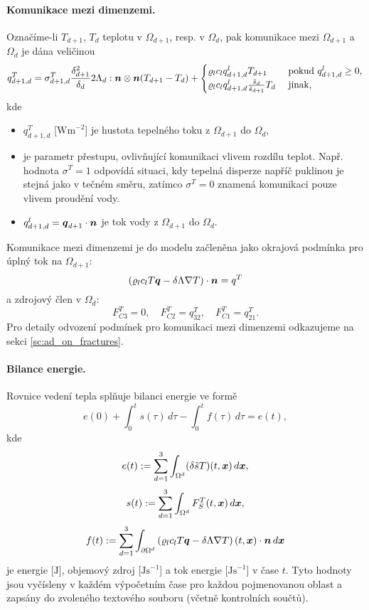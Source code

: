 \paragraph{Komunikace mezi dimenzemi.}
Označíme-li $T_{d+1}$, $T_d$ teplotu v $\Omega_{d+1}$, resp. v $\Omega_d$, pak komunikace mezi $\Omega_{d+1}$ a $\Omega_d$ je dána veličinou
\begin{equation}
  \label{e:inter_dim_flux_heat}
  q^T_{d+1,d} = \sigma^T_{d+1,d} \frac{\delta_{d+1}^2}{\delta_d}2\Lambda_d:\mathbf{\boldsymbol{n}}\otimes\mathbf{\boldsymbol{n}} ( T_{d+1} - T_d)
  + \begin{cases} \varrho_l c_l q^l_{d+1,d} T_{d+1} & \mbox{ pokud }q^l_{d+1,d}\ge 0,\\\varrho_l c_l q^l_{d+1,d} \frac{\tilde s_d}{\tilde s_{d+1}} T_d & \mbox{ jinak},\end{cases}
\end{equation}
kde
\begin{itemize}
\item $q^T_{d+1,d}$ [$\mathrm{Wm}^{-2}$] je hustota tepelného toku z $\Omega_{d+1}$ do $\Omega_d$,
\item {} \units{}{}{} je parametr přestupu, ovlivňující komunikaci vlivem rozdílu teplot.
Např. hodnota $\sigma^T=1$ odpovídá situaci, kdy tepelná disperze napříč puklinou je stejná jako v tečném směru, zatímco $\sigma^T=0$ znamená komunikaci pouze vlivem proudění vody.
\item $q^l_{d+1,d}=\mathbf{\boldsymbol{q}}_{d+1}\cdot\mathbf{\boldsymbol{n}}$ je tok vody z $\Omega_{d+1}$ do $\Omega_d$.
\end{itemize}
Komunikace mezi dimenzemi je do modelu začleněna jako okrajová podmínka pro úplný tok na $\Omega_{d+1}$:
\begin{equation}
\label{e:heat_FC}
\left(\varrho_l c_l T \mathbf{\boldsymbol{q}} - \delta\Lambda\nabla T\right)\cdot\mathbf{\boldsymbol{n}} = q^T
\end{equation}
a zdrojový člen v $\Omega_d$:
\begin{equation}
F^T_{C3} = 0,\quad
F^T_{C2} = q^T_{32},\quad
F^T_{C1} = q^T_{21}.
\end{equation}
Pro detaily odvození podmínek pro komunikaci mezi dimenzemi odkazujeme na sekci \ref{sc:ad_on_fractures}.



\paragraph{Bilance energie.}
Rovnice vedení tepla splňuje bilanci energie ve formě
$$ e(0) + \int_0^t s(\tau) \,d\tau - \int_0^t f(\tau) \,d\tau = e(t), $$
kde
$$ e(t) := \sum_{d=1}^3\int_{\Omega^d}(\delta \tilde s T)(t,\mathbf{\boldsymbol{x}})\,d\mathbf{\boldsymbol{x}}, $$
$$ s(t) := \sum_{d=1}^3\int_{\Omega^d}F_S^T(t,\mathbf{\boldsymbol{x}})\,d\mathbf{\boldsymbol{x}}, $$
$$ f(t) := \sum_{d=1}^3\int_{\partial\Omega^d}\left(\varrho_l c_l T\mathbf{\boldsymbol{q}} - \delta\Lambda\nabla T\right)(t,\mathbf{\boldsymbol{x}})\cdot\mathbf{\boldsymbol{n}} \,d\mathbf{\boldsymbol{x}} $$
je energie [$\mathrm{J}$], objemový zdroj [$\mathrm{Js}^{-1}$] a tok energie [$\mathrm{Js}^{-1}$] v čase $t$.
Tyto hodnoty jsou vyčísleny v každém výpočetním čase pro každou pojmenovanou oblast a zapsány do zvoleného textového souboru (včetně kontrolních součtů).





